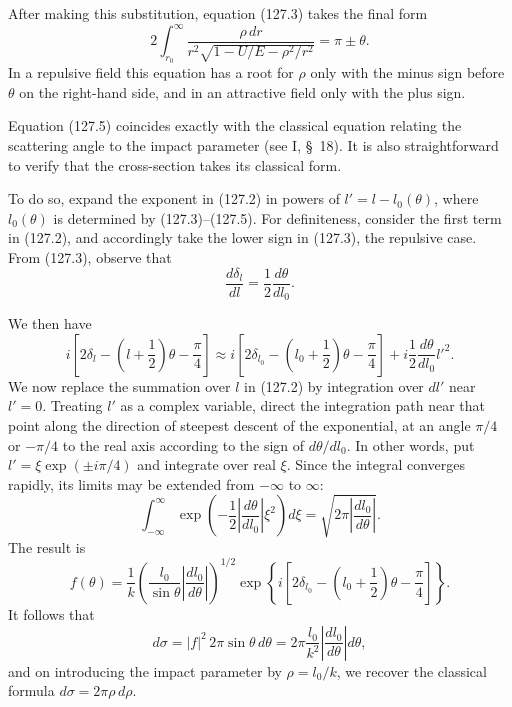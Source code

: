 After making this substitution, equation (127.3) takes the final form
\begin{equation}
 2\int_{r_0}^{\infty}\frac{\rho\,dr}{r^2\sqrt{1-U/E-\rho^2/r^2}}=\pi\pm\theta.
 \tag{127.5}
\end{equation}
In a repulsive field this equation has a root for $\rho$ only with the minus sign before $\theta$ on the right-hand side, and in an attractive field only with the plus sign.

Equation (127.5) coincides exactly with the classical equation relating the scattering angle to the impact parameter (see I, \S~18). It is also straightforward to verify that the cross-section takes its classical form.

To do so, expand the exponent in (127.2) in powers of $l'=l-l_0(\theta)$, where $l_0(\theta)$ is determined by (127.3)--(127.5). For definiteness, consider the first term in (127.2), and accordingly take the lower sign in (127.3), the repulsive case. From (127.3), observe that
\[
 \frac{d\delta_l}{dl}=\frac12\frac{d\theta}{dl_0}.
\]

We then have
\[
 i\left[2\delta_l-\left(l+\frac12\right)\theta-\frac\pi4\right]
 \approx i\left[2\delta_{l_0}-\left(l_0+\frac12\right)\theta-\frac\pi4\right]
 +i\frac12\frac{d\theta}{dl_0}l'^2.
\]
We now replace the summation over $l$ in (127.2) by integration over $dl'$ near $l'=0$. Treating $l'$ as a complex variable, direct the integration path near that point along the direction of steepest descent of the exponential, at an angle $\pi/4$ or $-\pi/4$ to the real axis according to the sign of $d\theta/dl_0$. In other words, put $l'=\xi\exp(\pm i\pi/4)$ and integrate over real $\xi$. Since the integral converges rapidly, its limits may be extended from $-\infty$ to $\infty$:
\[
 \int_{-\infty}^{\infty}\exp\left(-\frac12\left|\frac{d\theta}{dl_0}\right|\xi^2\right)d\xi
 =\sqrt{2\pi\left|\frac{dl_0}{d\theta}\right|}.
\]
The result is
\begin{equation}
 f(\theta)=\frac1k\left(\frac{l_0}{\sin\theta}\left|\frac{dl_0}{d\theta}\right|\right)^{1/2}
 \exp\left\{i\left[2\delta_{l_0}-\left(l_0+\frac12\right)\theta-\frac\pi4\right]\right\}.
 \tag{127.6}
\end{equation}
It follows that
\begin{equation}
 d\sigma=|f|^2\,2\pi\sin\theta\,d\theta
 =2\pi\frac{l_0}{k^2}\left|\frac{dl_0}{d\theta}\right|d\theta,
 \tag{127.7}
\end{equation}
and on introducing the impact parameter by $\rho=l_0/k$, we recover the classical formula $d\sigma=2\pi\rho\,d\rho$.

